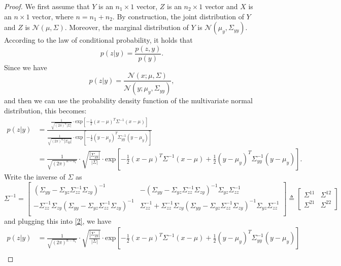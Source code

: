 \documentclass[11pt]{article}
\begin{document}
\begin{proof}
We first assume that $Y$ is an $n_1\times 1$ vector, $Z$ is an $n_2\times 1$ vector and $X$ is an $n\times 1$ vector, where $n=n_1+n_2$. By construction, the joint distribution of $Y$ and $Z$ is $\mathcal{N}(\mu,\Sigma)$. Moreover, the marginal distribution of $Y$ is $\mathcal{N}(\mu_y,\Sigma_{yy})$. According to the law of conditional probability, it holds that
\[
p(z|y) = \frac{p(z,y)}{p(y)}.
\]
Since we have 
\[
p(z|y) = \frac{\mathcal{N}(x;\mu,\Sigma)}{\mathcal{N}(y;\mu_y,\Sigma_{yy})},
\]
and then we can use the probability density function of the multivariate normal distribution, this becomes:
\begin{equation}
    \label{2}
    \begin{aligned}
        p(z|y) & = \frac{\frac{1}{\sqrt{(2\pi)^{n}|\Sigma|}}\cdot\text{exp}\left[-\frac{1}{2}(x-\mu)^{T}\Sigma^{-1}(x-\mu)\right]}{\frac{1}{\sqrt{(2\pi)^{n_1}|\Sigma_{yy}|}}\cdot\text{exp}\left[-\frac{1}{2}(y-\mu_y)^{T}\Sigma_{yy}^{-1}(y-\mu_y)\right]} \\
        & = \frac{1}{\sqrt{(2\pi)^{n-n_1}}}\cdot\sqrt{\frac{|\Sigma_{yy}|}{|\Sigma|}}\cdot\text{exp}\left[-\frac{1}{2}(x-\mu)^{T}\Sigma^{-1}(x-\mu)+\frac{1}{2}(y-\mu_y)^{T}\Sigma_{yy}^{-1}(y-\mu_y)\right].
    \end{aligned}
\end{equation}
Write the inverse of $\Sigma$ as 
\[
\Sigma^{-1} = 
\begin{bmatrix}
    (\Sigma_{yy}-\Sigma_{yz}\Sigma_{zz}^{-1}\Sigma_{zy})^{-1} & -(\Sigma_{yy}-\Sigma_{yz}\Sigma_{zz}^{-1}\Sigma_{zy})^{-1}\Sigma_{yz}\Sigma_{zz}^{-1} \\
    -\Sigma_{zz}^{-1}\Sigma_{zy}(\Sigma_{yy}-\Sigma_{yz}\Sigma_{zz}^{-1}\Sigma_{zy})^{-1} & \Sigma_{zz}^{-1}+\Sigma_{zz}^{-1}\Sigma_{zy}(\Sigma_{yy}-\Sigma_{yz}\Sigma_{zz}^{-1}\Sigma_{zy})^{-1}\Sigma_{yz}\Sigma_{zz}^{-1} \\
\end{bmatrix}
\triangleq
\begin{bmatrix}
    \Sigma^{11} & \Sigma^{12} \\
    \Sigma^{21} & \Sigma^{22}
\end{bmatrix}
\]
and plugging this into \eqref{2}, we have 
\begin{equation*}
    \begin{aligned}
        p(z|y) & = \frac{1}{\sqrt{(2\pi)^{n-n_1}}}\cdot\sqrt{\frac{|\Sigma_{yy}|}{|\Sigma|}}\cdot\text{exp}\left[-\frac{1}{2}(x-\mu)^{T}\Sigma^{-1}(x-\mu)+\frac{1}{2}(y-\mu_y)^{T}\Sigma_{yy}^{-1}(y-\mu_y)\right] \\

\end{aligned}
\end{equation*}
\end{proof}
\end{document}
